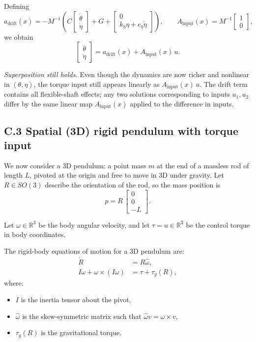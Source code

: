 \documentclass[12pt]{article}
\begin{document}
Defining
\[
  a_{\mathrm{drift}}(x) =
  -M^{-1}
  \left(
    C
    \begin{bmatrix}
      \dot{\theta} \\ \dot{\eta}
    \end{bmatrix}
    + G +
    \begin{bmatrix}
      0 \\ k_\eta \eta + c_\eta \dot{\eta}
    \end{bmatrix}
  \right),
  \qquad
  A_{\mathrm{input}}(x) =
  M^{-1}
  \begin{bmatrix}
    1 \\ 0
  \end{bmatrix},
\]
we obtain
\[
  \begin{bmatrix}
    \ddot{\theta} \\ \ddot{\eta}
  \end{bmatrix}
  =
  a_{\mathrm{drift}}(x) + A_{\mathrm{input}}(x)\,u.
\]

\emph{Superposition still holds.}  
Even though the dynamics are now richer and nonlinear in \((\theta,\eta)\), the torque input still appears linearly as \(A_{\mathrm{input}}(x)\,u\). The drift term contains all flexible-shaft effects; any two solutions corresponding to inputs \(u_1,u_2\) differ by the same linear map \(A_{\mathrm{input}}(x)\) applied to the difference in inputs.

\subsection{C.3 \quad Spatial (3D) rigid pendulum with torque input}

We now consider a 3D pendulum: a point mass \(m\) at the end of a massless rod of length \(L\), pivoted at the origin and free to move in 3D under gravity. Let \(R \in SO(3)\) describe the orientation of the rod, so the mass position is
\[
  p = R\,\begin{bmatrix} 0 \\ 0 \\ -L \end{bmatrix}.
\]

Let \(\omega \in \mathbb{R}^3\) be the body angular velocity, and let \(\tau = u \in \mathbb{R}^3\) be the control torque in body coordinates.

The rigid-body equations of motion for a 3D pendulum are:
\begin{align}
  \dot{R} &= R \hat{\omega}, \\
  I \dot{\omega} + \omega \times (I\omega) &= \tau + \tau_g(R),
\end{align}
where:
\begin{itemize}
  \item \(I\) is the inertia tensor about the pivot,
  \item \(\hat{\omega}\) is the skew-symmetric matrix such that \(\hat{\omega}v = \omega \times v\),
  \item \(\tau_g(R)\) is the gravitational torque.
\end{itemize}
\end{document}

